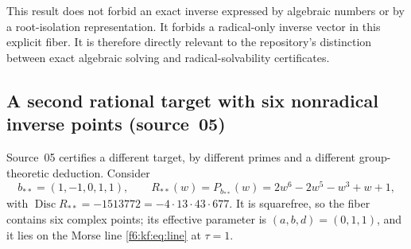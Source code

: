 \documentclass[11pt,a4paper]{article}
\theoremstyle{definition}
\newcommand{\Disc}{\operatorname{Disc}}
\newcommand{\src}[1]{\textup{(source~#1)}}
\begin{document}
This result does not forbid an exact inverse expressed by algebraic
numbers or by a root-isolation representation. It forbids a radical-only
inverse vector in this explicit fiber. It is therefore directly relevant
to the repository's distinction between exact algebraic solving and
radical-solvability certificates.

\subsection{A second rational target with six nonradical inverse points
\src{05}}
\label{f6:kf:sec:arithmetic}
Source~05 certifies a different target, by different primes and a different
group-theoretic deduction. Consider
\begin{equation}\label{f6:kf:eq:qstar}
b_{**}=(1,-1,0,1,1),\qquad
R_{**}(w)=P_{b_{**}}(w)=2w^6-2w^5-w^3+w+1,
\end{equation}
with $\Disc R_{**}=-1513772=-4\cdot13\cdot43\cdot677$. It is squarefree, so
the fiber contains six complex points; its effective parameter is
$(a,b,d)=(0,1,1)$, and it lies on the Morse line \eqref{f6:kf:eq:line} at
$\tau=1$.
\end{document}
